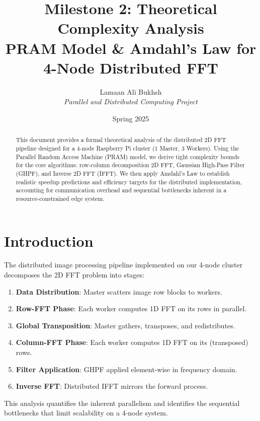 \documentclass[11pt,a4paper]{article}
\title{Milestone 2: Theoretical Complexity Analysis\\
\large PRAM Model \& Amdahl's Law for 4-Node Distributed FFT}
\author{Lamaan Ali Bukhsh \\ \textit{Parallel and Distributed Computing Project}}
\date{Spring 2025}
\begin{document}
\maketitle

\begin{abstract}
This document provides a formal theoretical analysis of the distributed 2D FFT pipeline designed for a 4-node Raspberry Pi cluster (1 Master, 3 Workers). Using the Parallel Random Access Machine (PRAM) model, we derive tight complexity bounds for the core algorithms: row-column decomposition 2D FFT, Gaussian High-Pass Filter (GHPF), and Inverse 2D FFT (IFFT). We then apply Amdahl's Law to establish realistic speedup predictions and efficiency targets for the distributed implementation, accounting for communication overhead and sequential bottlenecks inherent in a resource-constrained edge system.
\end{abstract}

\tableofcontents
\newpage

\section{Introduction}

The distributed image processing pipeline implemented on our 4-node cluster decomposes the 2D FFT problem into stages:
\begin{enumerate}
    \item \textbf{Data Distribution}: Master scatters image row blocks to workers.
    \item \textbf{Row-FFT Phase}: Each worker computes 1D FFT on its rows in parallel.
    \item \textbf{Global Transposition}: Master gathers, transposes, and redistributes.
    \item \textbf{Column-FFT Phase}: Each worker computes 1D FFT on its (transposed) rows.
    \item \textbf{Filter Application}: GHPF applied element-wise in frequency domain.
    \item \textbf{Inverse FFT}: Distributed IFFT mirrors the forward process.
\end{enumerate}

This analysis quantifies the inherent parallelism and identifies the sequential bottlenecks that limit scalability on a 4-node system.
\end{document}
